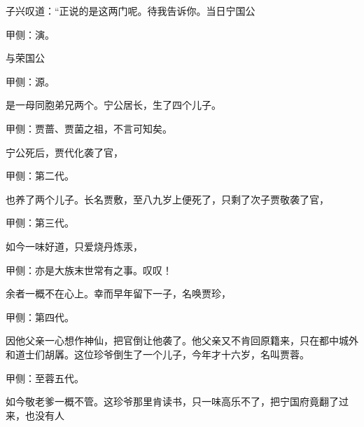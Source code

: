 \begin{parag}
    子兴叹道：“正说的是这两门呢。待我告诉你。当日宁国公\begin{note}甲侧：演。\end{note}与荣国公\begin{note}甲侧：源。\end{note}是一母同胞弟兄两个。宁公居长，生了四个儿子。\begin{note}甲侧：贾蔷、贾菌之祖，不言可知矣。\end{note}宁公死后，贾代化袭了官，\begin{note}甲侧：第二代。\end{note}也养了两个儿子。长名贾敷，至八九岁上便死了，只剩了次子贾敬袭了官，\begin{note}甲侧：第三代。\end{note}如今一味好道，只爱烧丹炼汞，\begin{note}甲侧：亦是大族末世常有之事。叹叹！\end{note}余者一概不在心上。幸而早年留下一子，名唤贾珍，\begin{note}甲侧：第四代。\end{note}因他父亲一心想作神仙，把官倒让他袭了。他父亲又不肯回原籍来，只在都中城外和道士们胡羼。这位珍爷倒生了一个儿子，今年才十六岁，名叫贾蓉。\begin{note}甲侧：至蓉五代。\end{note}如今敬老爹一概不管。这珍爷那里肯读书，只一味高乐不了，把宁国府竟翻了过来，也没有人
\end{parag}
